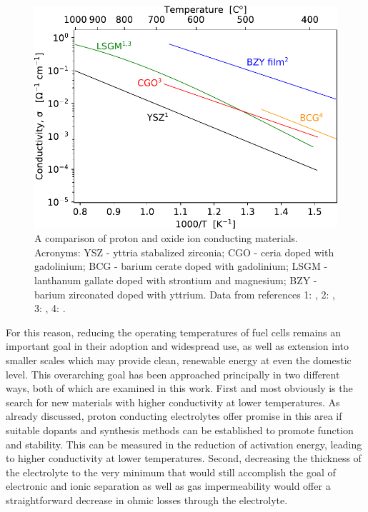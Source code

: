 \begin{figure}
    \centering
    \includegraphics{Figures/ArrheniusComparison.pdf}
    \caption{A comparison of proton and oxide ion conducting materials. Acronyms: YSZ - yttria stabalized zirconia; CGO - ceria doped with gadolinium; BCG - barium cerate doped with gadolinium; LSGM - lanthanum gallate doped with strontium and magnesium; BZY - barium zirconated doped with yttrium. Data from references 1: \textcite{Wincewicz2005}, 2: \textcite{Pergolesi2010}, 3: \textcite{Esposito2008}, 4: \textcite{Ishihara2000}.}
    \label{back:fig:ArrheniusComparison}
\end{figure}

For this reason, reducing the operating temperatures of fuel cells remains an important goal in their adoption and widespread use, as well as extension into smaller scales which may provide clean, renewable energy at even the domestic level. This overarching goal has been approached principally in two different ways, both of which are examined in this work. First and most obviously is the search for new materials with higher conductivity at lower temperatures. As already discussed, proton conducting electrolytes offer promise in this area if suitable dopants and synthesis methods can be established to promote function and stability. This can be measured in the reduction of activation energy, leading to higher conductivity at lower temperatures. Second, decreasing the thickness of the electrolyte to the very minimum that would still accomplish the goal of electronic and ionic separation as well as gas impermeability would offer a straightforward decrease in ohmic losses through the electrolyte.  